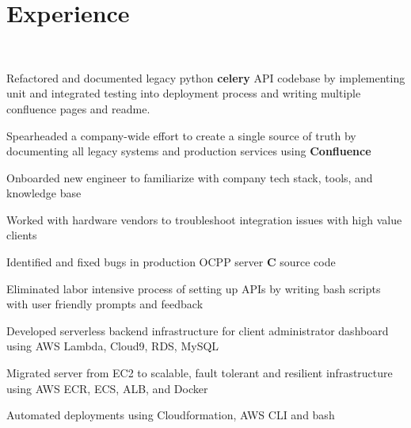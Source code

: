\documentclass[]{deedy-resume-openfont}
\begin{document}
\begin{minipage}[t]{0.66\textwidth} 


\section{Experience}
 \\
\vspace{\topsep} %
\begin{tightemize}
    \item Refactored and documented legacy python \textbf{celery} API codebase by implementing unit and integrated testing into deployment process and writing multiple confluence pages and readme.
    \item Spearheaded a company-wide effort to create a single source of truth by documenting all legacy systems and production services using \textbf{Confluence}
    \item Onboarded new engineer to familiarize with company tech stack, tools, and knowledge base
    \item Worked with hardware vendors to troubleshoot integration issues with high value clients
    \item Identified and fixed bugs in production OCPP server \textbf{C} source code
    \item Eliminated labor intensive process of setting up APIs by writing bash scripts with user friendly prompts and feedback
\end{tightemize}
\begin{tightemize}
    \item Developed serverless backend infrastructure for client administrator dashboard using AWS Lambda, Cloud9, RDS, MySQL
    \item Migrated server from EC2 to scalable, fault tolerant and resilient infrastructure using AWS ECR, ECS, ALB, and Docker
    \item Automated deployments using Cloudformation, AWS CLI and bash
\end{tightemize}


\end{minipage}
\end{document}
